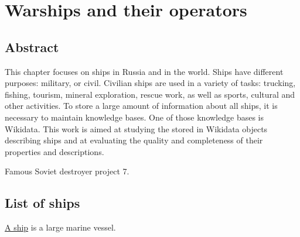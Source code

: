 \setchapterpreamble[u]{\margintoc}
\chapter{Warships and their operators\protect\footnotemark}


\section{Abstract}

This chapter focuses on ships in Russia and in the world. Ships have different purposes: military, or civil. Civilian ships are used in a variety of tasks: trucking, fishing, tourism, mineral exploration, rescue work, as well as sports, cultural and other activities. To store a large amount of information about all ships, it is necessary to maintain knowledge bases. One of those knowledge bases is Wikidata. This work is aimed at studying the stored in Wikidata objects describing ships and at evaluating the quality and completeness of their properties and descriptions.

\label{question:ship_1}

\begin{marginfigure}[0.0cm]
  {
    \setlength{\fboxsep}{0pt}%
    \setlength{\fboxrule}{1pt}%
  }
  \caption{Famous Soviet destroyer project 7.}%
  \label{fig:quiz_question_ship}%
\end{marginfigure}

\section{List of ships}

\href{https://en.wikipedia.org/wiki/Ship}{A ship} is a large marine vessel.

